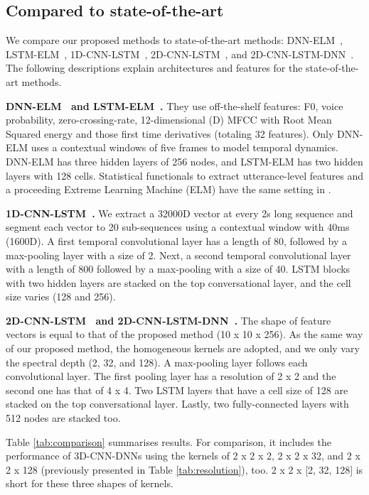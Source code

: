 \documentclass[conference, compsoc, twoside]{IEEEtran}
\begin{document}
\subsection{Compared to state-of-the-art}
We compare our proposed methods to state-of-the-art methods: DNN-ELM~\cite{kunHan2014dnn}, LSTM-ELM~\cite{lee2015high}, 1D-CNN-LSTM~\cite{trigeorgis2016adieu}, 2D-CNN-LSTM~\cite{anandconvoluted}, and 2D-CNN-LSTM-DNN~\cite{sainath2015convolutional}. The following descriptions explain architectures and features for the state-of-the-art methods.

\textbf{DNN-ELM~\cite{kunHan2014dnn} and LSTM-ELM~\cite{lee2015high}.} They use off-the-shelf features: F0, voice probability, zero-crossing-rate, 12-dimensional (D) MFCC with Root Mean Squared energy and those first time derivatives (totaling 32 features). Only DNN-ELM uses a contextual windows of five frames to model temporal dynamics. DNN-ELM has three hidden layers of 256 nodes, and LSTM-ELM has two hidden layers with 128 cells. Statistical functionals to extract utterance-level features and a proceeding Extreme Learning Machine (ELM) have the same setting in \cite{kunHan2014dnn,lee2015high}.

\textbf{1D-CNN-LSTM~\cite{trigeorgis2016adieu}.} We extract a 32000D vector at every 2s long sequence and segment each vector to 20 sub-sequences using a contextual window with 40ms (1600D). A first temporal convolutional layer has a length of 80, followed by a max-pooling layer with a size of 2. Next, a second temporal convolutional layer with a length of 800 followed by a max-pooling with a size of 40. LSTM blocks with two hidden layers are stacked on the top conversational layer, and the cell size varies (128 and 256).

\textbf{2D-CNN-LSTM~\cite{anandconvoluted} and 2D-CNN-LSTM-DNN~\cite{sainath2015convolutional}.} The shape of feature vectors is equal to that of the proposed method (10 x 10 x 256). As the same way of our proposed method, the homogeneous kernels are adopted, and we only vary the spectral depth (2, 32, and 128). A max-pooling layer follows each convolutional layer. The first pooling layer has a resolution of 2 x 2 and the second one has that of 4 x 4. Two LSTM layers that have a cell size of 128 are stacked on the top conversational layer. Lastly, two fully-connected layers with 512 nodes are stacked too.


Table \ref{tab:comparison} summarises results. For comparison, it includes the performance of 3D-CNN-DNNs using the kernels of 2 x 2 x 2, 2 x 2 x 32, and 2 x 2 x 128 (previously presented in Table \ref{tab:resolution}), too.  2 x 2 x [2, 32, 128] is short for these three shapes of kernels. 
\end{document}
